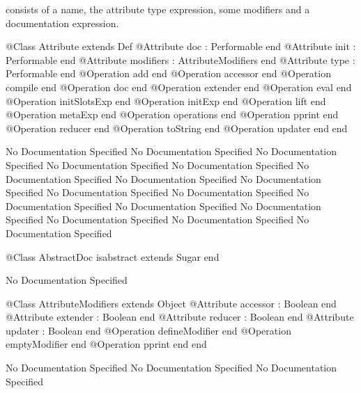         consists of a name, the attribute type expression, some modifiers 
        and a documentation expression.
\begin{Interface}
@Class Attribute extends Def
  @Attribute doc : Performable end
  @Attribute init : Performable end
  @Attribute modifiers : AttributeModifiers end
  @Attribute type : Performable end
  @Operation add end
  @Operation accessor end
  @Operation compile end
  @Operation doc end
  @Operation extender end
  @Operation eval end
  @Operation initSlotsExp end
  @Operation initExp end
  @Operation lift end
  @Operation metaExp end
  @Operation operations end
  @Operation pprint end
  @Operation reducer end
  @Operation toString end
  @Operation updater end
end
\end{Interface}
No Documentation Specified
No Documentation Specified
No Documentation Specified
No Documentation Specified
No Documentation Specified
No Documentation Specified
No Documentation Specified
No Documentation Specified
No Documentation Specified
No Documentation Specified
No Documentation Specified
No Documentation Specified
No Documentation Specified
No Documentation Specified
No Documentation Specified
No Documentation Specified
\begin{Interface}
@Class AbstractDoc isabstract extends Sugar
end
\end{Interface}
No Documentation Specified
\begin{Interface}
@Class AttributeModifiers extends Object
  @Attribute accessor : Boolean end
  @Attribute extender : Boolean end
  @Attribute reducer : Boolean end
  @Attribute updater : Boolean end
  @Operation defineModifier end
  @Operation emptyModifier end
  @Operation pprint end
end
\end{Interface}
No Documentation Specified
No Documentation Specified
No Documentation Specified

